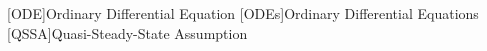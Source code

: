 \begin{acronym}

  [ODE]{Ordinary Differential Equation}
  [ODEs]{Ordinary Differential Equations}
  [QSSA]{Quasi-Steady-State Assumption}

\end{acronym}
